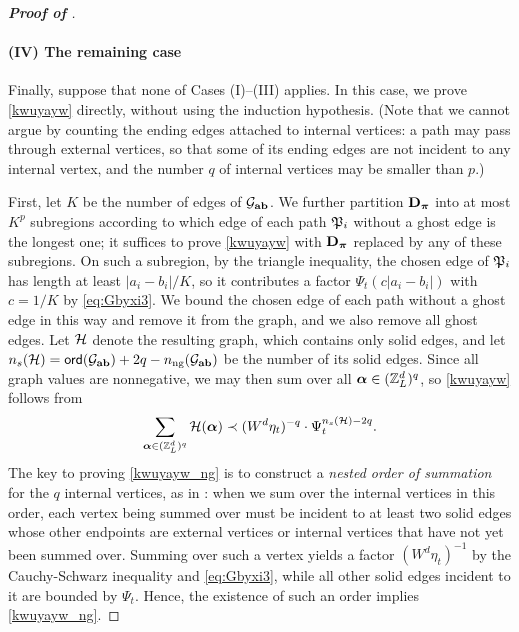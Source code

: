 \begin{proof}[\bf Proof of ]




\paragraph{\bf (IV) The remaining case}


Finally, suppose that none of Cases (I)--(III) applies. In this case, we prove \eqref{kwuyayw} directly, without using the induction hypothesis. (Note that we cannot argue by counting the ending edges attached to internal vertices: a path may pass through external vertices, so that some of its ending edges are not incident to any internal vertex, and the number $q$ of internal vertices may be smaller than $p$.)

First, let $K$ be the number of edges of $\cal G_{\ba\bfb}$. We further partition $\bD_{\bpi}$ into at most $K^p$ subregions according to which edge of each path $\fP_i$ without a ghost edge is the longest one; it suffices to prove \eqref{kwuyayw} with $\bD_{\bpi}$ replaced by any of these subregions. On such a subregion, by the triangle inequality, the chosen edge of $\fP_i$ has length at least $|a_i-b_i|/K$, so it contributes a factor $\Psi_t(c|a_i-b_i|)$ with $c=1/K$ by \eqref{eq:Gbyxi3}. We bound the chosen edge of each path without a ghost edge in this way and remove it from the graph, and we also remove all ghost edges. Let $\cal H$ denote the resulting graph, which contains only solid edges, and let $n_s(\cal H)=\ord(\cal G_{\ba\bfb})+2q-n_{\ngh}(\cal G_{\ba\bfb})$ be the number of its solid edges. Since all graph values are nonnegative, we may then sum over all $\bal\in(\Zn)^q$, so \eqref{kwuyayw} follows from
\begin{align}\label{kwuyayw_ng}
        \sum_{\bal\in (\Zn)^q} \cal H(\bal) \prec (W^d\eta_t)^{-q}\cdot \Psi_t^{n_s(\cal H)-2q}.
    \end{align}
The key to proving \eqref{kwuyayw_ng} is to construct a \emph{nested order of summation} for the $q$ internal vertices, as in \cite{yang2021random}: when we sum over the internal vertices in this order, each vertex being summed over must be incident to at least two solid edges whose other endpoints are external vertices or internal vertices that have not yet been summed over. Summing over such a vertex yields a factor $(W^d\eta_t)^{-1}$ by the Cauchy-Schwarz inequality and \eqref{eq:Gbyxi3}, while all other solid edges incident to it are bounded by $\Psi_t$. Hence, the existence of such an order implies \eqref{kwuyayw_ng}.


\end{proof}
